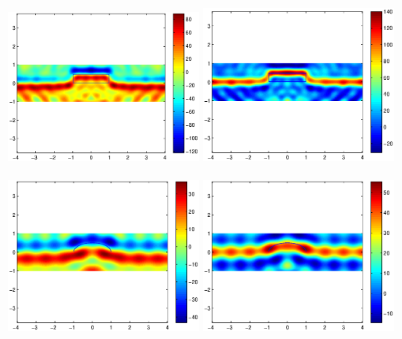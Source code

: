 \documentclass[12pt]{iopart}
\begin{document}
\begin{figure}
	\centering
	\includegraphics[width=0.45\textwidth]{./figure_rough/square_multi}
	\includegraphics[width=0.45\textwidth]{./figure_rough/square_multi_real}
	\caption{}\label{I1}
\end{figure}
\begin{figure}
	\centering
	\includegraphics[width=0.45\textwidth]{./figure_rough/hemicircle_1}
	\includegraphics[width=0.45\textwidth]{./figure_rough/hemicircle_1_real}
	\caption{}\label{I1}
\end{figure}
\end{document}
